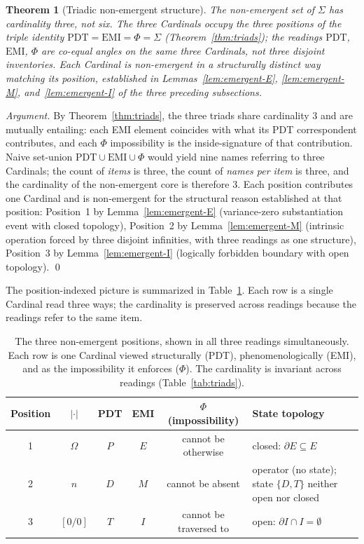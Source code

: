 \documentclass[11pt,a4paper]{article}
\newtheorem{theorem}{Theorem}[section]
\theoremstyle{definition}
\theoremstyle{remark}
\begin{document}
\begin{theorem}[Triadic non-emergent structure]\label{thm:nonemergent-triadic}
The non-emergent set of $\Sigma$ has cardinality three, not six. The three Cardinals occupy the three positions of the triple identity $\mathrm{PDT}=\mathrm{EMI}=\Phi=\Sigma$ (Theorem~\ref{thm:triads}); the readings $\mathrm{PDT}$, $\mathrm{EMI}$, $\Phi$ are co-equal angles on the same three Cardinals, not three disjoint inventories. Each Cardinal is non-emergent in a structurally distinct way matching its position, established in Lemmas~\ref{lem:emergent-E}, \ref{lem:emergent-M}, and~\ref{lem:emergent-I} of the three preceding subsections.
\end{theorem}

\begin{proof}[Argument]
By Theorem~\ref{thm:triads}, the three triads share cardinality $3$ and are mutually entailing: each EMI element coincides with what its PDT correspondent contributes, and each $\Phi$ impossibility is the inside-signature of that contribution. Naive set-union $\mathrm{PDT}\cup\mathrm{EMI}\cup\Phi$ would yield nine names referring to three Cardinals; the count of \emph{items} is three, the count of \emph{names per item} is three, and the cardinality of the non-emergent core is therefore $3$. Each position contributes one Cardinal and is non-emergent for the structural reason established at that position: Position~1 by Lemma~\ref{lem:emergent-E} (variance-zero substantiation event with closed topology), Position~2 by Lemma~\ref{lem:emergent-M} (intrinsic operation forced by three disjoint infinities, with three readings as one structure), Position~3 by Lemma~\ref{lem:emergent-I} (logically forbidden boundary with open topology). \qed
\end{proof}

The position-indexed picture is summarized in Table~\ref{tab:antiemergent-positions}. Each row is a single Cardinal read three ways; the cardinality is preserved across readings because the readings refer to the same item.

\begin{table}[h]
\centering
\begin{tabular}{@{}c c c c c >{\raggedright\arraybackslash}p{}@{}}
\toprule
Position & $|\cdot|$ & PDT & EMI & $\Phi$ (impossibility) & State topology\\
\midrule
1 & $\Omega$    & $P$ & $E$ & cannot be otherwise        & closed: $\partial E \subseteq E$\\
2 & $n$         & $D$ & $M$ & cannot be absent            & operator (no state); state $\{D,T\}$ neither open nor closed\\
3 & $[0/0]$     & $T$ & $I$ & cannot be traversed to     & open: $\partial I \cap I = \emptyset$\\
\bottomrule
\end{tabular}
\caption{The three non-emergent positions, shown in all three readings simultaneously. Each row is one Cardinal viewed structurally (PDT), phenomenologically (EMI), and as the impossibility it enforces ($\Phi$). The cardinality is invariant across readings (Table~\ref{tab:triads}).}
\label{tab:antiemergent-positions}
\end{table}
\end{document}
